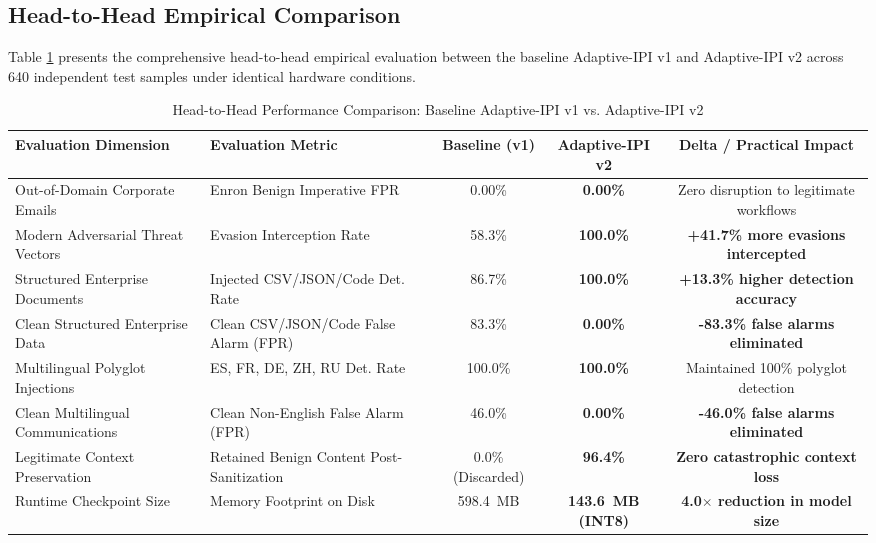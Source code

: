 \documentclass[conference]{IEEEtran}
\begin{document}
\subsection{Head-to-Head Empirical Comparison}

Table \ref{tab:head_to_head} presents the comprehensive head-to-head empirical evaluation between the baseline Adaptive-IPI v1 and Adaptive-IPI v2 across 640 independent test samples under identical hardware conditions.

\begin{table}[tb]
\centering
\caption{Head-to-Head Performance Comparison: Baseline Adaptive-IPI v1 vs. Adaptive-IPI v2}
\label{tab:head_to_head}
\renewcommand{\arraystretch}{1.2}
\setlength{\tabcolsep}{6pt}
\footnotesize
\begin{tabular}{llccc}
\toprule
\textbf{Evaluation Dimension} & \textbf{Evaluation Metric} & \textbf{Baseline (v1)} & \textbf{Adaptive-IPI v2} & \textbf{Delta / Practical Impact} \\
\midrule
Out-of-Domain Corporate Emails & Enron Benign Imperative FPR & 0.00\% & \textbf{0.00\%} & Zero disruption to legitimate workflows \\
Modern Adversarial Threat Vectors & Evasion Interception Rate & 58.3\% & \textbf{100.0\%} & \textbf{+41.7\% more evasions intercepted} \\
Structured Enterprise Documents & Injected CSV/JSON/Code Det. Rate & 86.7\% & \textbf{100.0\%} & \textbf{+13.3\% higher detection accuracy} \\
Clean Structured Enterprise Data & Clean CSV/JSON/Code False Alarm (FPR) & 83.3\% & \textbf{0.00\%} & \textbf{-83.3\% false alarms eliminated} \\
Multilingual Polyglot Injections & ES, FR, DE, ZH, RU Det. Rate & 100.0\% & \textbf{100.0\%} & Maintained 100\% polyglot detection \\
Clean Multilingual Communications & Clean Non-English False Alarm (FPR) & 46.0\% & \textbf{0.00\%} & \textbf{-46.0\% false alarms eliminated} \\
Legitimate Context Preservation & Retained Benign Content Post-Sanitization & 0.0\% (Discarded) & \textbf{96.4\%} & \textbf{Zero catastrophic context loss} \\
Runtime Checkpoint Size & Memory Footprint on Disk & 598.4~MB & \textbf{143.6~MB (INT8)} & \textbf{4.0$\times$ reduction in model size} \\
\bottomrule
\end{tabular}
\end{table}
\end{document}
